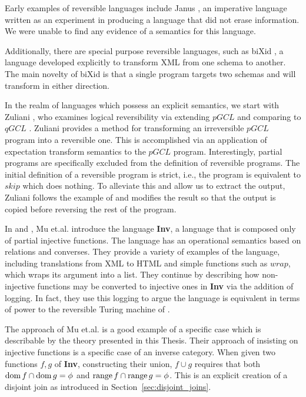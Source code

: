 Early examples of reversible languages include Janus \cite{lutz1986janus}, an imperative language
written as an experiment in producing a language that did not erase information. We were unable to
find any evidence of a semantics for this language.

Additionally, there are special purpose reversible languages, such as biXid \cite{bixid06}, a
language developed explicitly to transform XML \cite{xml} from one schema to another. The main
novelty of biXid is that a single program targets two schemas and will transform in either direction.

In the realm of languages which possess an explicit semantics, we start with Zuliani
\cite{zuliani01:reversibility}, who examines logical reversibility via extending $pGCL$
\cite{MorganIver99} and comparing to $qGCL$ \cite{sanders:quantum}. Zuliani provides a method for
transforming an irreversible $pGCL$ program into a reversible one. This is accomplished via an
application of expectation transform semantics to the $pGCL$ program. Interestingly, partial
programs are specifically excluded from the definition of reversible programs. The initial
definition of a reversible program is strict, i.e., the program is equivalent to $skip$
which does nothing. To alleviate this and allow us to extract the output, Zuliani follows the example of
\cite{bennett:1973reverse} and modifies the result so that the output is copied before reversing the
rest of the program.

In \cite{mu06bidirectional} and \cite{muetal04:injreversible}, Mu et.al. introduce the language
\textbf{Inv}, a language that is composed only of partial injective functions. The language has an
operational semantics based on relations and converses. They provide a variety of examples of the
language, including translations from XML to HTML and simple functions such as $wrap$, which wraps
its argument into a list. They continue by describing how non-injective functions may be converted to
injective ones in \textbf{Inv} via the addition of logging. In fact, they use this logging to argue
the language is equivalent in terms of power to the reversible Turing machine of
\cite{bennett:1973reverse}.

The approach of Mu et.al. is a good example of a specific case which is describable by the theory
presented in this Thesis. Their approach of insisting on injective functions is a specific case of
an inverse category. When given two functions $f,g$ of \textbf{Inv}, constructing their union,
$f\cup g$ requires that both $\operatorname*{dom} f \cap \operatorname*{dom} g = \phi$ and $\operatorname*{range} f \cap \operatorname*{range} g =
\phi$. This is an explicit creation of a disjoint join as introduced in
Section~\ref{sec:disjoint_joins}.

